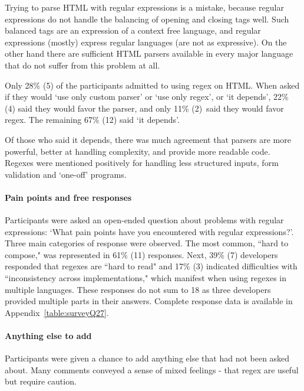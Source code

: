Trying to parse HTML with regular expressions is a mistake, because regular expressions do not handle the balancing of  opening and closing tags well.  Such balanced tags are an expression of a context free language, and regular expressions (mostly) express regular languages (are not as expressive).  On the other hand there are sufficient HTML parsers available in every major language that do not suffer from this problem at all.

Only 28\% (5) of the participants admitted to using regex on HTML.  When asked if they would `use only custom parser' or `use only regex', or `it depends', 22\% (4) said they would favor the parser, and only 11\% (2) said they would favor regex.  The remaining 67\% (12) said `it depends'.

Of those who said it depends, there was much agreement that parsers are more powerful, better at handling complexity, and provide more readable code.  Regexes were mentioned positively for handling less structured inputs, form validation and `one-off' programs.

\paragraph{Pain points and free responses}\label{sec:painPoints}  Participants were asked an open-ended question about problems with regular expressions: `What pain points have you encountered with regular expressions?'.  Three main categories of response were observed. The most common, ``hard to compose," was represented in 61\% (11) responses. Next, 39\% (7) developers responded that regexes are ``hard to read" and 17\% (3) indicated difficulties with ``inconsistency across implementations," which manifest when using regexes in multiple languages. These responses do not sum to 18 as three developers provided multiple parts in their answers.  Complete response data is available in Appendix~\ref{table:surveyQ27}.

\paragraph{Anything else to add}  Participants were given a chance to add anything else that had not been asked about.  Many comments conveyed a sense of mixed feelings - that regex are useful but require caution.

